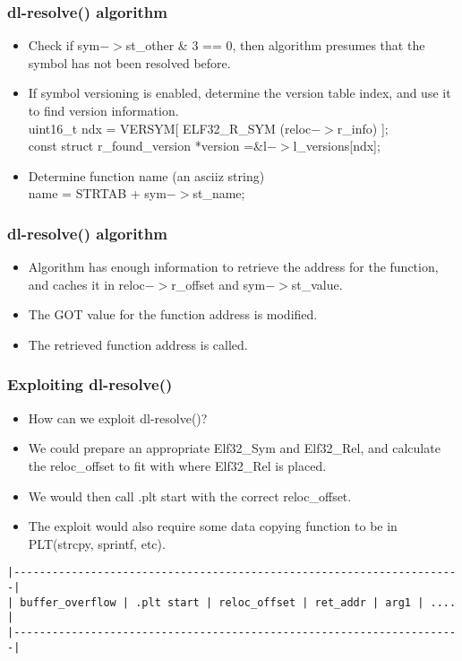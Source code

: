 \documentclass[10pt]{beamer}
\begin{document}
\begin{frame}[fragile]
\frametitle{dl-resolve() algorithm}
 \begin{itemize}
    \item Check if sym$->$st\_other \& 3 == 0, then algorithm presumes that the symbol has not been resolved before.

    \item If symbol versioning is enabled, determine the version table index, and use it to find version information.
    \\
    uint16\_t ndx = VERSYM[ ELF32\_R\_SYM (reloc$->$r\_info) ];
    \\
    const struct r\_found\_version *version =\&l$->$l\_versions[ndx];

    \item Determine function name (an asciiz string)
    \\
    name = STRTAB + sym$->$st\_name;
  \end{itemize}

\end{frame}

\begin{frame}[fragile]
\frametitle{dl-resolve() algorithm}
 \begin{itemize}
    \item Algorithm has enough information to retrieve the address for the function, and caches it in reloc$->$r\_offset and sym$->$st\_value.

    \item The GOT value for the function address is modified.

    \item The retrieved function address is called.
  \end{itemize}

\end{frame}

\begin{frame}[fragile]
\frametitle{Exploiting dl-resolve()}

\begin{itemize}
\item How can we exploit dl-resolve()?

\item We could prepare an appropriate Elf32\_Sym and Elf32\_Rel, and calculate the reloc\_offset to fit with where Elf32\_Rel is placed.

\item We would then call .plt start with the
correct reloc\_offset.
\item The exploit would also require some data copying function to be in PLT(strcpy, sprintf, etc).

\end{itemize}

\scriptsize
\begin{verbatim}
|----------------------------------------------------------------------|
| buffer_overflow | .plt start | reloc_offset | ret_addr | arg1 | .... |
|----------------------------------------------------------------------|
\end{verbatim}
\normalsize


\end{frame}
\end{document}
